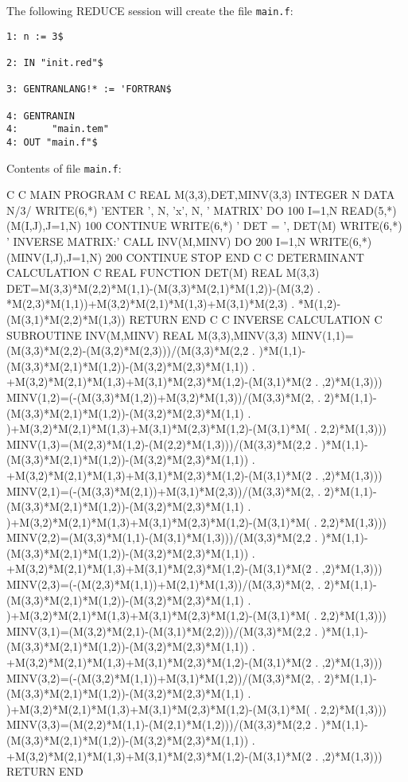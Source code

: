 The following REDUCE session will create the file {\tt main.f}:
\begin{verbatim}
1: n := 3$

2: IN "init.red"$

3: GENTRANLANG!* := 'FORTRAN$

4: GENTRANIN
4:      "main.tem"
4: OUT "main.f"$
\end{verbatim}
Contents of file {\tt main.f}:
\begin{framedverbatim}
C
C  MAIN PROGRAM
C
      REAL M(3,3),DET,MINV(3,3)
      INTEGER N
      DATA N/3/
      WRITE(6,*) 'ENTER ', N, 'x', N, ' MATRIX'
      DO 100 I=1,N
          READ(5,*) (M(I,J),J=1,N)
100   CONTINUE
      WRITE(6,*) ' DET = ', DET(M)
      WRITE(6,*) ' INVERSE MATRIX:'
      CALL INV(M,MINV)
      DO 200 I=1,N
          WRITE(6,*) (MINV(I,J),J=1,N)
200   CONTINUE
      STOP
      END
C
C  DETERMINANT CALCULATION
C
      REAL FUNCTION DET(M)
      REAL M(3,3)
      DET=M(3,3)*M(2,2)*M(1,1)-(M(3,3)*M(2,1)*M(1,2))-(M(3,2)
     . *M(2,3)*M(1,1))+M(3,2)*M(2,1)*M(1,3)+M(3,1)*M(2,3)
     . *M(1,2)-(M(3,1)*M(2,2)*M(1,3))
      RETURN
      END
C
C  INVERSE CALCULATION
C
      SUBROUTINE INV(M,MINV)
      REAL M(3,3),MINV(3,3)
      MINV(1,1)=(M(3,3)*M(2,2)-(M(3,2)*M(2,3)))/(M(3,3)*M(2,2
     . )*M(1,1)-(M(3,3)*M(2,1)*M(1,2))-(M(3,2)*M(2,3)*M(1,1))
     . +M(3,2)*M(2,1)*M(1,3)+M(3,1)*M(2,3)*M(1,2)-(M(3,1)*M(2
     . ,2)*M(1,3)))
      MINV(1,2)=(-(M(3,3)*M(1,2))+M(3,2)*M(1,3))/(M(3,3)*M(2,
     . 2)*M(1,1)-(M(3,3)*M(2,1)*M(1,2))-(M(3,2)*M(2,3)*M(1,1)
     . )+M(3,2)*M(2,1)*M(1,3)+M(3,1)*M(2,3)*M(1,2)-(M(3,1)*M(
     . 2,2)*M(1,3)))
      MINV(1,3)=(M(2,3)*M(1,2)-(M(2,2)*M(1,3)))/(M(3,3)*M(2,2
     . )*M(1,1)-(M(3,3)*M(2,1)*M(1,2))-(M(3,2)*M(2,3)*M(1,1))
     . +M(3,2)*M(2,1)*M(1,3)+M(3,1)*M(2,3)*M(1,2)-(M(3,1)*M(2
     . ,2)*M(1,3)))
      MINV(2,1)=(-(M(3,3)*M(2,1))+M(3,1)*M(2,3))/(M(3,3)*M(2,
     . 2)*M(1,1)-(M(3,3)*M(2,1)*M(1,2))-(M(3,2)*M(2,3)*M(1,1)
     . )+M(3,2)*M(2,1)*M(1,3)+M(3,1)*M(2,3)*M(1,2)-(M(3,1)*M(
     . 2,2)*M(1,3)))
      MINV(2,2)=(M(3,3)*M(1,1)-(M(3,1)*M(1,3)))/(M(3,3)*M(2,2
     . )*M(1,1)-(M(3,3)*M(2,1)*M(1,2))-(M(3,2)*M(2,3)*M(1,1))
     . +M(3,2)*M(2,1)*M(1,3)+M(3,1)*M(2,3)*M(1,2)-(M(3,1)*M(2
     . ,2)*M(1,3)))
      MINV(2,3)=(-(M(2,3)*M(1,1))+M(2,1)*M(1,3))/(M(3,3)*M(2,
     . 2)*M(1,1)-(M(3,3)*M(2,1)*M(1,2))-(M(3,2)*M(2,3)*M(1,1)
     . )+M(3,2)*M(2,1)*M(1,3)+M(3,1)*M(2,3)*M(1,2)-(M(3,1)*M(
     . 2,2)*M(1,3)))
      MINV(3,1)=(M(3,2)*M(2,1)-(M(3,1)*M(2,2)))/(M(3,3)*M(2,2
     . )*M(1,1)-(M(3,3)*M(2,1)*M(1,2))-(M(3,2)*M(2,3)*M(1,1))
     . +M(3,2)*M(2,1)*M(1,3)+M(3,1)*M(2,3)*M(1,2)-(M(3,1)*M(2
     . ,2)*M(1,3)))
      MINV(3,2)=(-(M(3,2)*M(1,1))+M(3,1)*M(1,2))/(M(3,3)*M(2,
     . 2)*M(1,1)-(M(3,3)*M(2,1)*M(1,2))-(M(3,2)*M(2,3)*M(1,1)
     . )+M(3,2)*M(2,1)*M(1,3)+M(3,1)*M(2,3)*M(1,2)-(M(3,1)*M(
     . 2,2)*M(1,3)))
      MINV(3,3)=(M(2,2)*M(1,1)-(M(2,1)*M(1,2)))/(M(3,3)*M(2,2
     . )*M(1,1)-(M(3,3)*M(2,1)*M(1,2))-(M(3,2)*M(2,3)*M(1,1))
     . +M(3,2)*M(2,1)*M(1,3)+M(3,1)*M(2,3)*M(1,2)-(M(3,1)*M(2
     . ,2)*M(1,3)))
      RETURN
      END
\end{framedverbatim}

